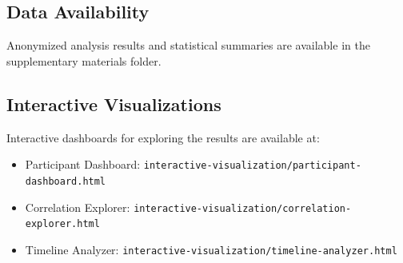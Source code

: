 \documentclass[12pt,a4paper]{article}
\begin{document}
\subsection*{Data Availability}

Anonymized analysis results and statistical summaries are available in the supplementary materials folder.

\subsection*{Interactive Visualizations}

Interactive dashboards for exploring the results are available at:
\begin{itemize}
    \item Participant Dashboard: \texttt{interactive-visualization/participant-dashboard.html}
    \item Correlation Explorer: \texttt{interactive-visualization/correlation-explorer.html}
    \item Timeline Analyzer: \texttt{interactive-visualization/timeline-analyzer.html}
\end{itemize}
\end{document}
